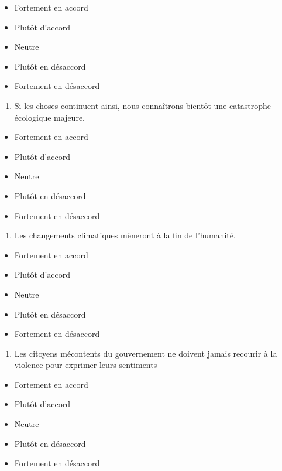 \documentclass[
  letterpaper,
  DIV=11,
  numbers=noendperiod]{scrreprt}
\providecommand{\tightlist}{%
  \setlength{\itemsep}{0pt}\setlength{\parskip}{0pt}}\usepackage{longtable,booktabs,array}
\begin{document}
\begin{itemize}
\tightlist
\item
  Fortement en accord
\item
  Plutôt d'accord
\item
  Neutre
\item
  Plutôt en désaccord
\item
  Fortement en désaccord
\end{itemize}

\begin{enumerate}
\def\labelenumi{\arabic{enumi}.}
\setcounter{enumi}{38}
\tightlist
\item
  Si les choses continuent ainsi, nous connaîtrons bientôt une
  catastrophe écologique majeure.
\end{enumerate}

\begin{itemize}
\tightlist
\item
  Fortement en accord
\item
  Plutôt d'accord
\item
  Neutre
\item
  Plutôt en désaccord
\item
  Fortement en désaccord
\end{itemize}

\begin{enumerate}
\def\labelenumi{\arabic{enumi}.}
\setcounter{enumi}{39}
\tightlist
\item
  Les changements climatiques mèneront à la fin de l'humanité.
\end{enumerate}

\begin{itemize}
\tightlist
\item
  Fortement en accord
\item
  Plutôt d'accord
\item
  Neutre
\item
  Plutôt en désaccord
\item
  Fortement en désaccord
\end{itemize}

\begin{enumerate}
\def\labelenumi{\arabic{enumi}.}
\setcounter{enumi}{40}
\tightlist
\item
  Les citoyens mécontents du gouvernement ne doivent jamais recourir à
  la violence pour exprimer leurs sentiments
\end{enumerate}

\begin{itemize}
\tightlist
\item
  Fortement en accord
\item
  Plutôt d'accord
\item
  Neutre
\item
  Plutôt en désaccord
\item
  Fortement en désaccord
\end{itemize}
\end{document}
